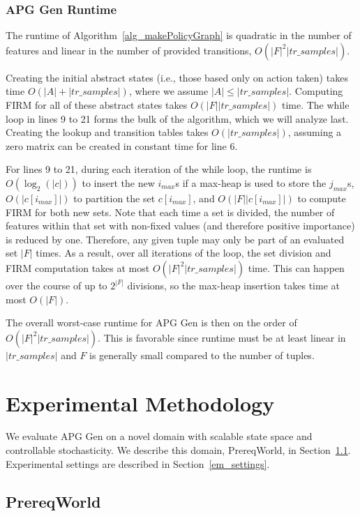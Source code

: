 \documentclass[letterpaper]{article} %
\begin{document}
\subsubsection{APG Gen Runtime}
The runtime of Algorithm~\ref{alg_makePolicyGraph} is quadratic in the number of features and linear in the number of provided transitions, $O(|F|^2 |tr\_samples|)$.



Creating the initial abstract states (i.e., those based only on action taken) takes time $O(|A| + |tr\_samples|)$, where we assume $|A| \leq |tr\_samples|$. Computing FIRM for all of these abstract states takes $O(|F| |tr\_samples|)$ time. The while loop in lines 9 to 21 forms the bulk of the algorithm, which we will analyze last. Creating the lookup and transition tables takes $O(|tr\_samples|)$, assuming a zero matrix can be created in constant time for line 6.

For lines 9 to 21, during each iteration of the while loop, the runtime is $O(\log_2(|c|))$ to insert the new $i_{max}$s if a max-heap is used to store the $j_{max}$s, $O(|c[i_{max}]|)$ to partition the set $c[i_{max}]$, and $O(|F| |c[i_{max}]|)$ to compute FIRM for both new sets. Note that each time a set is divided, the number of features within that set with non-fixed values (and therefore positive importance) is reduced by one. Therefore, any given tuple may only be part of an evaluated set $|F|$ times. As a result, over all iterations of the loop, the set division and FIRM computation takes at most $O(|F|^2 |tr\_samples|)$ time. This can happen over the course of up to $2^{|F|}$ divisions, so the max-heap insertion takes time at most $O(|F|)$.

The overall worst-case runtime for APG Gen is then on the order of $O(|F|^2 |tr\_samples|)$. This is favorable since runtime must be at least linear in $|tr\_samples|$ and $F$ is generally small compared to the number of tuples.

\section{Experimental Methodology}
We evaluate APG Gen on a novel domain with scalable state space and controllable stochasticity. We describe this domain, PrereqWorld, in Section~\ref{em_prereqworld}. Experimental settings are described in Section~\ref{em_settings}.

\subsection{PrereqWorld} \label{em_prereqworld}
\end{document}
